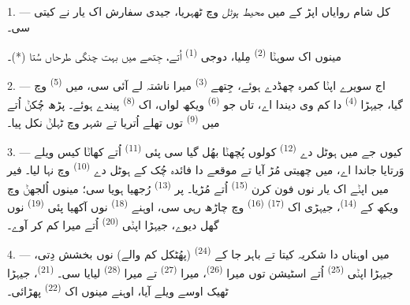 %


\VUsaut{3.0mm}
\VUsaut{1.6mm}
\VUsaut{2.0mm}
\VUsaut{3.4mm}

1. --- کل شام روایاں اپڑ کے میں \textit{محیط ہوٹل} وچ ٹھہریا، جیدی سفارش اک یار نے
کیتی سی۔

مینوں اک سوہݨا  \textsuperscript{(2)} مِلیا، دوجی 
\textsuperscript{(1)} اُتے، جِتھے میں بہت چنگی طرحاں سُتا (*)۔

2. --- اج سویرے اپݨا کمرہ چھڈدے ہوئے، جِتھے  \textsuperscript{(3)}
میرا ناشتہ لے آئی سی، میں  \textsuperscript{(5)} وچ گیا،
جیہڑا  \textsuperscript{(4)} دا کم وی دیندا اے، تاں جو
 \textsuperscript{(6)} ویکھ لواں، اک  \textsuperscript{(8)}
پیندے ہوئے۔ پڑھ چُکݨ اُتے میں  \textsuperscript{(9)} توں تھلے اُتریا تے
شہر وچ ٹہلݨ نکل پیا۔

3. --- کیوں جے میں ہوٹل دے  \textsuperscript{(12)} کولوں پُچھݨا بھُل گیا
سی پئی  \textsuperscript{(11)} اُتے کھاݨا کیس ویلے وَرتایا جاندا
اے، میں چھیتی مُڑ آیا تے موقعے دا فائدہ چُک کے ہوٹل دے 
\textsuperscript{(10)} وچ نہا لیا۔ فیر میں اپݨے اک یار نوں فون کرن
 \textsuperscript{(15)} اُتے مُڑیا۔ پر 
\textsuperscript{(13)} رُجھیا ہویا سی؛ مینوں اُلجھݨ وچ ویکھ کے 
\textsuperscript{(14)}، جیہڑی اک  \textsuperscript{(17)}
 \textsuperscript{(16)} وچ چاڑھ رہی سی، اوہنے
 \textsuperscript{(18)} نوں آکھیا پئی 
\textsuperscript{(19)} نوں گھل دیوے، جیہڑا اپݨی  \textsuperscript{(20)}
اُتے میرا کم کر آوے۔

4. --- میں اوہناں دا شکریہ کیتا تے باہر جا کے  \textsuperscript{(24)}
(پھُٹکل کم والے) نوں بخشش دِتی، جیہڑا اپݨی  \textsuperscript{(25)}
اُتے اسٹیشن توں میرا  \textsuperscript{(26)}، میرا
 \textsuperscript{(27)} تے میرا  \textsuperscript{(28)}
لیایا سی۔  \textsuperscript{(21)}، جیہڑا ٹھیک اوسے ویلے آیا، اوہنے
مینوں اک  \textsuperscript{(22)} پھڑائی۔

